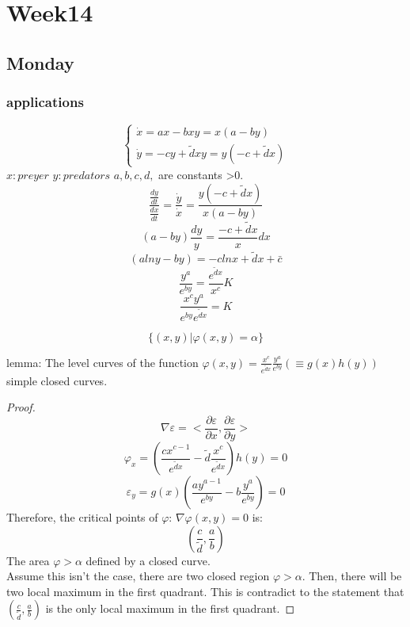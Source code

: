 \chapter{Week14}

\section{Monday}
\subsection{applications}
\[\begin{cases}\dot{x}=ax-bxy=x(a-by)\\
\dot{y}=-cy+\tilde{d}xy=y(-c+\tilde{d}x)
\end{cases}
\]
$x:preyer$ $y:predators$ $a, b, c, d, $ are constants >0.
\[\frac{\frac{dy}{dt}}{\frac{dx}{dt}}=\frac{\dot{y}}{\dot{x}}=\frac{y(-c+\tilde{d}x)}{x(a-by)}
\]
\[(a-by)\frac{dy}{y}=\frac{-c+\tilde{d}x}{x}dx\]
\[(alny-by)=-clnx+\tilde{d}x+\bar{c}
\]
\[\frac{y^a}{e^{by}}=\frac{e^{\tilde{d}x}}{x^c}K
\]
\[\frac{x^cy^a}{e^{by}e^{\tilde{d}x}}=K
\]
\begin{definition}
\[\{(x,y)|\varphi(x,y)=\alpha\}
\]
\end{definition}
lemma: The level curves of the function $\varphi(x,y)=\frac{x^c}{e^{\tilde{d}x}}\frac{y^a}{e^{by}}(\equiv g(x)h(y))$ simple closed curves.
\begin{proof}
\[\nabla\varepsilon=<\frac{\partial\varepsilon}{\partial x},\frac{\partial\varepsilon}{\partial y}>
\]
\[\varphi_x=(\frac{cx^{c-1}}{e^{\tilde{d}x}}-\tilde{d}\frac{x^c}{e^{\tilde{d}x}})h(y)=0
\]
\[\varepsilon_y=g(x)(\frac{ay^{a-1}}{e^{by}}-b\frac{y^a}{e^{by}})=0
\]
Therefore, the critical points of $\varphi$: $\nabla\varphi(x,y)=0$ is:\\
\[(\frac{c}{\tilde{d}},\frac{a}{b})
\]
The area $\varphi>\alpha$ defined by a closed curve. \\
Assume this isn't the case, there are two closed region $\varphi>\alpha$. Then, there will be two local maximum in the first quadrant. This is contradict to the statement that $(\frac{c}{\tilde{d}},\frac{a}{b})$ is the only local maximum in the first quadrant.

\end{proof}

